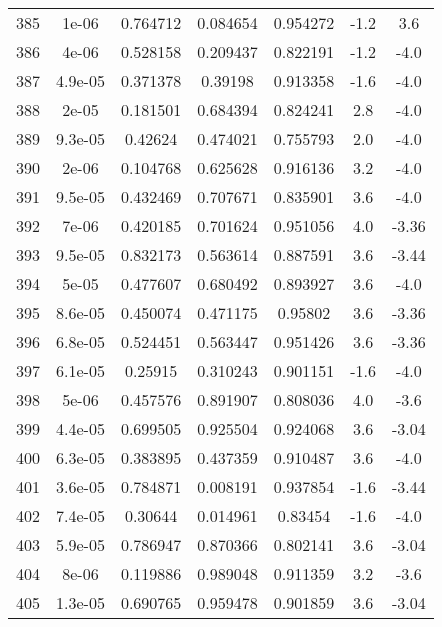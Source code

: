 \begin{table}
\begin{tabular}{c|c|c|c|c|c|c}
385 & 1e-06 & 0.764712 & 0.084654 & 0.954272 & -1.2 & 3.6\\
386 & 4e-06 & 0.528158 & 0.209437 & 0.822191 & -1.2 & -4.0\\
387 & 4.9e-05 & 0.371378 & 0.39198 & 0.913358 & -1.6 & -4.0\\
388 & 2e-05 & 0.181501 & 0.684394 & 0.824241 & 2.8 & -4.0\\
389 & 9.3e-05 & 0.42624 & 0.474021 & 0.755793 & 2.0 & -4.0\\
390 & 2e-06 & 0.104768 & 0.625628 & 0.916136 & 3.2 & -4.0\\
391 & 9.5e-05 & 0.432469 & 0.707671 & 0.835901 & 3.6 & -4.0\\
392 & 7e-06 & 0.420185 & 0.701624 & 0.951056 & 4.0 & -3.36\\
393 & 9.5e-05 & 0.832173 & 0.563614 & 0.887591 & 3.6 & -3.44\\
394 & 5e-05 & 0.477607 & 0.680492 & 0.893927 & 3.6 & -4.0\\
395 & 8.6e-05 & 0.450074 & 0.471175 & 0.95802 & 3.6 & -3.36\\
396 & 6.8e-05 & 0.524451 & 0.563447 & 0.951426 & 3.6 & -3.36\\
397 & 6.1e-05 & 0.25915 & 0.310243 & 0.901151 & -1.6 & -4.0\\
398 & 5e-06 & 0.457576 & 0.891907 & 0.808036 & 4.0 & -3.6\\
399 & 4.4e-05 & 0.699505 & 0.925504 & 0.924068 & 3.6 & -3.04\\
400 & 6.3e-05 & 0.383895 & 0.437359 & 0.910487 & 3.6 & -4.0\\
401 & 3.6e-05 & 0.784871 & 0.008191 & 0.937854 & -1.6 & -3.44\\
402 & 7.4e-05 & 0.30644 & 0.014961 & 0.83454 & -1.6 & -4.0\\
403 & 5.9e-05 & 0.786947 & 0.870366 & 0.802141 & 3.6 & -3.04\\
404 & 8e-06 & 0.119886 & 0.989048 & 0.911359 & 3.2 & -3.6\\
405 & 1.3e-05 & 0.690765 & 0.959478 & 0.901859 & 3.6 & -3.04\\
\end{tabular}
\end{table}
\newpage
